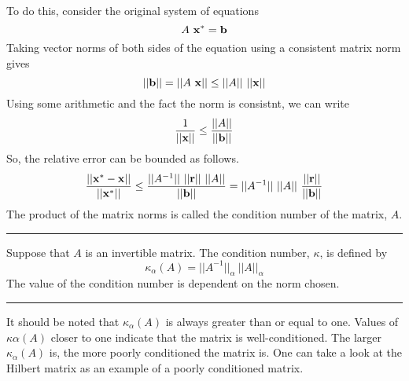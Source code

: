\documentclass[10pt,fleqn]{article}
\begin{document}
To do this, consider the original system of equations
$$
  A\ {\bf x^*} = {\bf b}
$$
Taking vector norms of both sides of the equation using a consistent matrix 
norm gives
$$
  || {\bf b} || = || A\ {\bf x} || \leq || A ||\ ||{\bf x} ||
$$
Using some arithmetic and the fact the norm is consistnt, we can write
$$
  {1\over{|| {\bf x} ||}} \leq {{ || A || }\over{ || {\bf b} || }}
$$
So, the relative error can be bounded as follows.
$$
  {{ || {\bf x^*} - {\bf x} || }\over{ || {\bf x^*} || }}
    \leq {{
           || A^{-1} ||\ || {\bf r} ||\ || A ||
         }\over{
           || {\bf b} ||
         }}
     = || A^{-1} ||\ || A || \ 
         {{
           || {\bf r} ||
         }\over{
           || {\bf b} ||
         }}
$$
The product of the matrix norms is called the condition number of the matrix,
$A$.
\vskip0.1in\hrule\vskip0.1in
  \begin{definition}
    Suppose that $A$ is an invertible matrix. The condition number, $\kappa$,
    is defined by
    $$
      \kappa_\alpha(A) = || A^{-1} ||_\alpha\ || A ||_\alpha
    $$
    The value of the condition number is dependent on the norm chosen.
  \end{definition}
\vskip0.1in\hrule\vskip0.1in
\noindent
It should be noted that $\kappa_\alpha(A)$ is always greater than or equal to
one. Values of $\kappa\alpha(A)$ closer to one indicate that the matrix is
well-conditioned. The larger $\kappa_\alpha(A)$ is, the more poorly conditioned
the matrix is. One can take a look at the Hilbert matrix as an example of a
poorly conditioned matrix.
\end{document}
